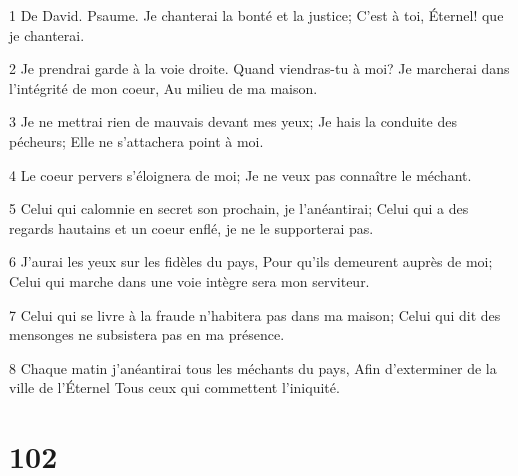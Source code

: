 \par 1 De David. Psaume. Je chanterai la bonté et la justice; C'est à toi, Éternel! que je chanterai.
\par 2 Je prendrai garde à la voie droite. Quand viendras-tu à moi? Je marcherai dans l'intégrité de mon coeur, Au milieu de ma maison.
\par 3 Je ne mettrai rien de mauvais devant mes yeux; Je hais la conduite des pécheurs; Elle ne s'attachera point à moi.
\par 4 Le coeur pervers s'éloignera de moi; Je ne veux pas connaître le méchant.
\par 5 Celui qui calomnie en secret son prochain, je l'anéantirai; Celui qui a des regards hautains et un coeur enflé, je ne le supporterai pas.
\par 6 J'aurai les yeux sur les fidèles du pays, Pour qu'ils demeurent auprès de moi; Celui qui marche dans une voie intègre sera mon serviteur.
\par 7 Celui qui se livre à la fraude n'habitera pas dans ma maison; Celui qui dit des mensonges ne subsistera pas en ma présence.
\par 8 Chaque matin j'anéantirai tous les méchants du pays, Afin d'exterminer de la ville de l'Éternel Tous ceux qui commettent l'iniquité.

\chapter{102}

